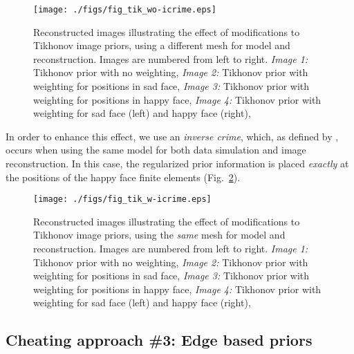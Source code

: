 \documentclass[12pt]{iopart}
\begin{document}
%
%
\begin{figure}[th]
\begin{flushright}
\texttt{[image: ./figs/fig\_tik\_wo-icrime.eps]}
\caption{\small 
Reconstructed images illustrating the effect of modifications
to Tikhonov image priors,
using a different mesh for model and reconstruction.
Images are numbered from left to right.
{\em Image 1:} Tikhonov prior with no weighting,
{\em Image 2:} Tikhonov prior with weighting for positions in sad face,
{\em Image 3:} Tikhonov prior with weighting for positions in happy face,
{\em Image 4:} Tikhonov prior with weighting for sad face (left) and
happy face (right),
 }
 \label{fig:tikprior}
\end{flushright}
\end{figure}

In order to enhance this effect, we use an {\em inverse crime},
which, as defined by \cite{Colton_and_Kress_1992}, occurs when
using the same model for both data simulation and image reconstruction.
In this case, the regularized prior information is placed
{\em exactly} at the positions of the happy face finite elements
(Fig.~\ref{fig:tikprior_icrime}).

%
%
\begin{figure}[th]
\begin{flushright}
\texttt{[image: ./figs/fig\_tik\_w-icrime.eps]}
\caption{\small 
Reconstructed images illustrating the effect of modifications
to Tikhonov image priors,
using the {\em same} mesh for model and reconstruction.
Images are numbered from left to right.
{\em Image 1:} Tikhonov prior with no weighting,
{\em Image 2:} Tikhonov prior with weighting for positions in sad face,
{\em Image 3:} Tikhonov prior with weighting for positions in happy face,
{\em Image 4:} Tikhonov prior with weighting for sad face (left) and
happy face (right),
 }
 \label{fig:tikprior_icrime}
\end{flushright}
\end{figure}


\subsection{ Cheating approach \#3:
             Edge based priors}
\end{document}
